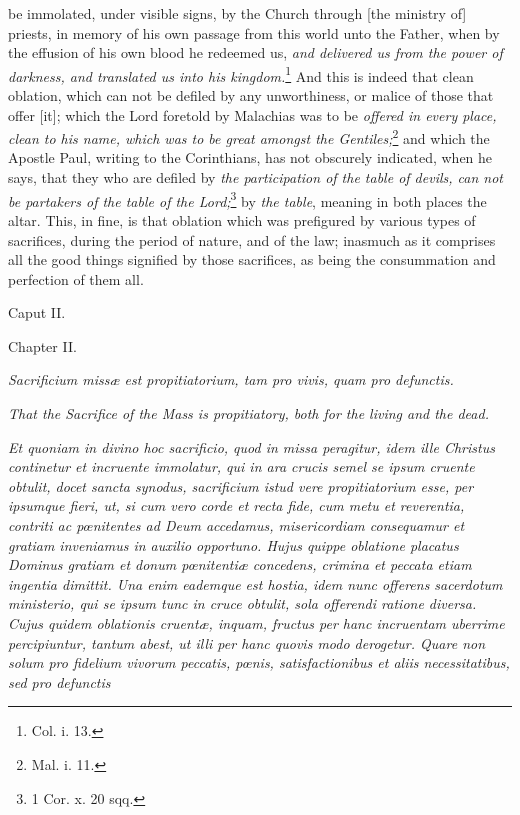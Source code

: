 be immolated, under visible signs, by the Church through [the ministry of] priests, in memory of his own passage from this world unto the Father, when by the effusion of his own blood he redeemed us, \emph{and delivered us from the power of darkness, and translated us into his kingdom.}\footnote{\par   Col. i. 13.} And this is indeed that clean oblation, which can not be defiled by any unworthiness, or malice of those that offer [it]; which the Lord foretold by Malachias was to be \emph{offered in every place, clean to his name, which was to be great amongst the Gentiles;}\footnote{\par   Mal. i. 11.} and which the Apostle Paul, writing to the Corinthians, has not obscurely indicated, when he says, that they who are defiled by \emph{the participation of the table of devils, can not be partakers of the table of the Lord;}\footnote{\par   1 Cor. x. 20 sqq.} by \emph{the table}, meaning in both places the altar. This, in fine, is that oblation which was prefigured by various types of sacrifices, during the period of nature, and of the law; inasmuch as it comprises all the good things signified by those sacrifices, as being the consummation and perfection of them all.

Caput II.

Chapter II.

\emph{Sacrificium missæ est propitiatorium, tam pro vivis, quam pro defunctis.}

\emph{That the Sacrifice of the Mass is propitiatory, both for the living and the dead.}

\emph{Et quoniam in divino hoc sacrificio, quod in missa peragitur, idem ille Christus continetur et incruente immolatur, qui in ara crucis semel se ipsum cruente obtulit, docet sancta synodus, sacrificium istud vere propitiatorium esse, per ipsumque fieri, ut, si cum vero corde et recta fide, cum metu et reverentia, contriti ac pœnitentes ad Deum accedamus, misericordiam consequamur et gratiam inveniamus in auxilio opportuno. Hujus quippe oblatione placatus Dominus gratiam et donum pœnitentiæ concedens, crimina et peccata etiam ingentia dimittit. Una enim eademque est hostia, idem nunc offerens sacerdotum ministerio, qui se ipsum tunc in cruce obtulit, sola offerendi ratione diversa. Cujus quidem oblationis cruentæ, inquam, fructus per hanc incruentam uberrime percipiuntur, tantum abest, ut illi per hanc quovis modo derogetur. Quare non solum pro fidelium vivorum peccatis, pœnis, satisfactionibus et aliis necessitatibus, sed pro defunctis }

